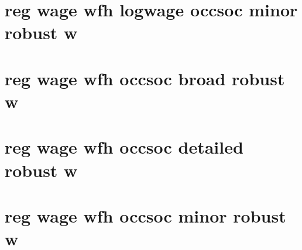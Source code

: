 \documentclass{article}
\begin{document}
\section{reg wage wfh  logwage occsoc minor robust w}

\newpage
\section{reg wage wfh  occsoc broad robust w}

\newpage
\section{reg wage wfh  occsoc detailed robust w}

\newpage
\section{reg wage wfh  occsoc minor robust w}

\newpage
\end{document}
